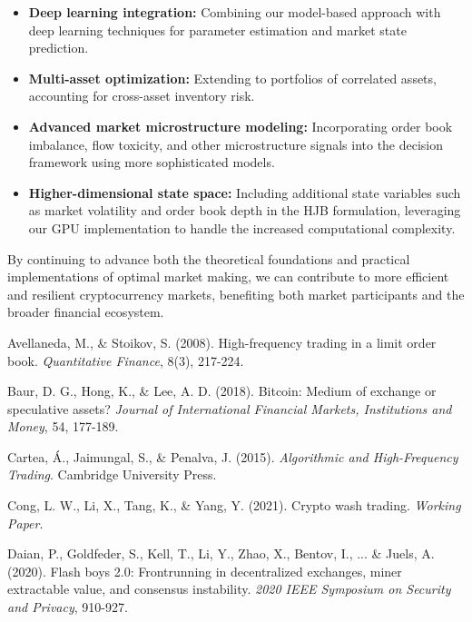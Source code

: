 \documentclass[onecolumn,ieee]{arithmaxresearch}
\begin{document}
\begin{twocolumn}
\begin{itemize}
    \item \textbf{Deep learning integration:} Combining our model-based approach with deep learning techniques for parameter estimation and market state prediction.
    
    \item \textbf{Multi-asset optimization:} Extending to portfolios of correlated assets, accounting for cross-asset inventory risk.
    
    \item \textbf{Advanced market microstructure modeling:} Incorporating order book imbalance, flow toxicity, and other microstructure signals into the decision framework using more sophisticated models.
    
    \item \textbf{Higher-dimensional state space:} Including additional state variables such as market volatility and order book depth in the HJB formulation, leveraging our GPU implementation to handle the increased computational complexity.
\end{itemize}

By continuing to advance both the theoretical foundations and practical implementations of optimal market making, we can contribute to more efficient and resilient cryptocurrency markets, benefiting both market participants and the broader financial ecosystem.

\begin{thebibliography}{99}

 Avellaneda, M., \& Stoikov, S. (2008). High-frequency trading in a limit order book. \textit{Quantitative Finance}, 8(3), 217-224.

 Baur, D. G., Hong, K., \& Lee, A. D. (2018). Bitcoin: Medium of exchange or speculative assets? \textit{Journal of International Financial Markets, Institutions and Money}, 54, 177-189.

 Cartea, Á., Jaimungal, S., \& Penalva, J. (2015). \textit{Algorithmic and High-Frequency Trading}. Cambridge University Press.

 Cong, L. W., Li, X., Tang, K., \& Yang, Y. (2021). Crypto wash trading. \textit{Working Paper}.

 Daian, P., Goldfeder, S., Kell, T., Li, Y., Zhao, X., Bentov, I., ... \& Juels, A. (2020). Flash boys 2.0: Frontrunning in decentralized exchanges, miner extractable value, and consensus instability. \textit{2020 IEEE Symposium on Security and Privacy}, 910-927.


\end{thebibliography}
\end{twocolumn}
\end{document}
